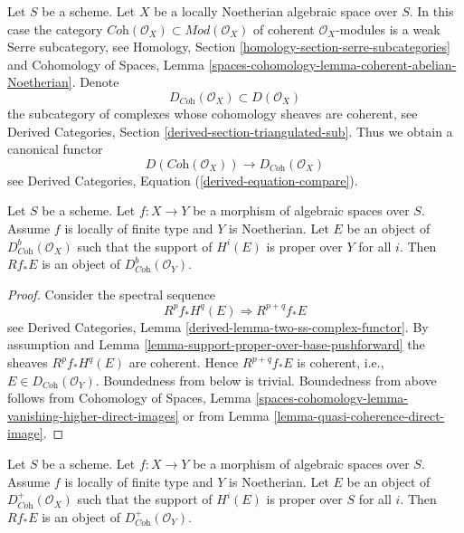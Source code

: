 \noindent
Let $S$ be a scheme. Let $X$ be a locally Noetherian algebraic space over $S$.
In this case the category
$\textit{Coh}(\mathcal{O}_X) \subset \textit{Mod}(\mathcal{O}_X)$
of coherent $\mathcal{O}_X$-modules is a weak Serre subcategory, see
Homology, Section \ref{homology-section-serre-subcategories}
and
Cohomology of Spaces, Lemma
\ref{spaces-cohomology-lemma-coherent-abelian-Noetherian}.
Denote
$$
D_{\textit{Coh}}(\mathcal{O}_X) \subset D(\mathcal{O}_X)
$$
the subcategory of complexes whose cohomology sheaves are coherent, see
Derived Categories, Section \ref{derived-section-triangulated-sub}.
Thus we obtain a canonical functor
\begin{equation}
\label{equation-compare-coherent}
D(\textit{Coh}(\mathcal{O}_X))
\longrightarrow
D_{\textit{Coh}}(\mathcal{O}_X)
\end{equation}
see Derived Categories, Equation (\ref{derived-equation-compare}).

\begin{lemma}
\label{lemma-direct-image-coherent}
Let $S$ be a scheme. Let $f : X \to Y$ be a morphism of algebraic spaces
over $S$. Assume $f$ is locally of finite type and $Y$ is Noetherian.
Let $E$ be an object of $D^b_{\textit{Coh}}(\mathcal{O}_X)$ such that the
support of $H^i(E)$ is proper over $Y$ for all $i$.
Then $Rf_*E$ is an object of $D^b_{\textit{Coh}}(\mathcal{O}_Y)$.
\end{lemma}

\begin{proof}
Consider the spectral sequence
$$
R^pf_*H^q(E) \Rightarrow R^{p + q}f_*E
$$
see Derived Categories, Lemma \ref{derived-lemma-two-ss-complex-functor}.
By assumption and Lemma \ref{lemma-support-proper-over-base-pushforward}
the sheaves $R^pf_*H^q(E)$ are coherent. Hence
$R^{p + q}f_*E$ is coherent, i.e., $E \in D_{\textit{Coh}}(\mathcal{O}_Y)$.
Boundedness from below is trivial. Boundedness from above
follows from
Cohomology of Spaces, Lemma
\ref{spaces-cohomology-lemma-vanishing-higher-direct-images}
or from
Lemma \ref{lemma-quasi-coherence-direct-image}.
\end{proof}

\begin{lemma}
\label{lemma-direct-image-coherent-bdd-below}
Let $S$ be a scheme. Let $f : X \to Y$ be a morphism of algebraic spaces
over $S$. Assume $f$ is locally of finite type and $Y$ is Noetherian.
Let $E$ be an object of
$D^+_{\textit{Coh}}(\mathcal{O}_X)$ such that the support of $H^i(E)$
is proper over $S$ for all $i$.
Then $Rf_*E$ is an object of $D^+_{\textit{Coh}}(\mathcal{O}_Y)$.
\end{lemma}


